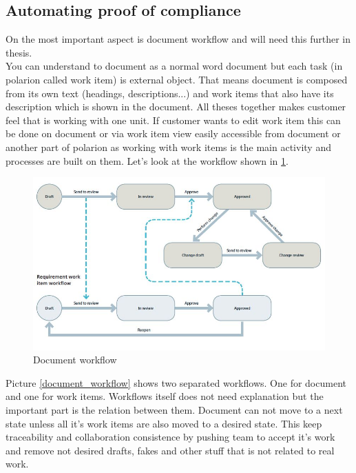 \documentclass[thesis=M,english]{FITthesis}[2012/06/26]
\begin{document}
\subsection{Automating proof of compliance}

On the most important aspect is document workflow and will need this further in thesis.\\ 

You can understand to document as a normal word document but each task (in \acrshort{polarion} called work item) is external object. That means document is composed from its own text (headings, descriptions...) and work items that also have its description which is shown in the document. All theses together makes customer feel that is working with one unit. If customer wants to edit work item this can be done on document or via work item view easily accessible from document or another part of \acrshort{polarion} as working with work items is the main activity and processes are built on them. Let's look at the workflow shown in \ref{fig:document_workflow}.

\begin{figure}[h!]\centering
	\includegraphics[width=1\textwidth]{pictures/document_workflow}
	\caption{Document workflow \cite{polarion_alm}}\label{fig:document_workflow}
\end{figure}

Picture \ref{document_workflow} shows two separated workflows. One for document and one for work items. Workflows itself does not need explanation but the important part is the relation between them. Document can not move to a next state unless all it's work items are also moved to a desired state. This keep traceability and collaboration consistence by pushing team to accept it's work and remove not desired drafts, fakes and other stuff that is not related to real work. 
\end{document}

